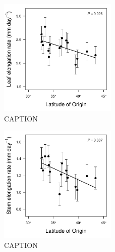 \documentclass[11pt, oneside]{article}
\begin{document}
\begin{figure}[h!]
	\centerline{\includegraphics[width=0.5\textwidth]{Figures/Figure_LLL_Lat.pdf}}
	\fontsize{10}{12}
	\selectfont
	\caption[Southern populations grow faster (leaf expansion rate).]{CAPTION}
	\label{fig:Fig_LLL}
\end{figure}

\begin{figure}
	\centerline{\includegraphics[width=0.5\textwidth]{Figures/Figure_Height_Lat.pdf}}
	\fontsize{10}{12}
	\selectfont
	\caption[Southern populations grow faster (stem elongation rate).]{CAPTION}
	\label{fig:Fig_height}
\end{figure}


\setlength{\bibsep}{6pt}
\bigskip



\end{document}
